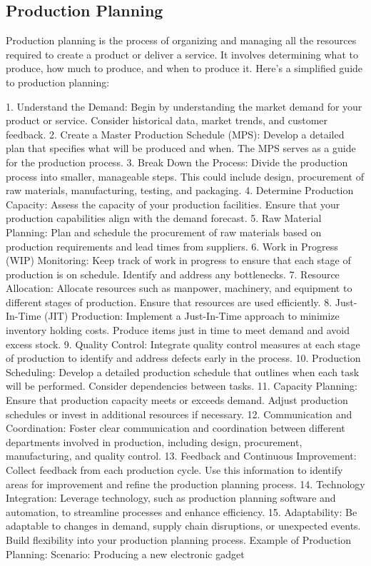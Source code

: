 % 
\subsection{Production Planning}
\label{relatedknowledge:Supply Chain Management:Production Planning}
% 
Production planning is the process of organizing and managing all the resources required to create a product or deliver a service. It involves determining what to produce, how much to produce, and when to produce it. Here's a simplified guide to production planning:

1. Understand the Demand:
Begin by understanding the market demand for your product or service. Consider historical data, market trends, and customer feedback.
2. Create a Master Production Schedule (MPS):
Develop a detailed plan that specifies what will be produced and when. The MPS serves as a guide for the production process.
3. Break Down the Process:
Divide the production process into smaller, manageable steps. This could include design, procurement of raw materials, manufacturing, testing, and packaging.
4. Determine Production Capacity:
Assess the capacity of your production facilities. Ensure that your production capabilities align with the demand forecast.
5. Raw Material Planning:
Plan and schedule the procurement of raw materials based on production requirements and lead times from suppliers.
6. Work in Progress (WIP) Monitoring:
Keep track of work in progress to ensure that each stage of production is on schedule. Identify and address any bottlenecks.
7. Resource Allocation:
Allocate resources such as manpower, machinery, and equipment to different stages of production. Ensure that resources are used efficiently.
8. Just-In-Time (JIT) Production:
Implement a Just-In-Time approach to minimize inventory holding costs. Produce items just in time to meet demand and avoid excess stock.
9. Quality Control:
Integrate quality control measures at each stage of production to identify and address defects early in the process.
10. Production Scheduling:
Develop a detailed production schedule that outlines when each task will be performed. Consider dependencies between tasks.
11. Capacity Planning:
Ensure that production capacity meets or exceeds demand. Adjust production schedules or invest in additional resources if necessary.
12. Communication and Coordination:
Foster clear communication and coordination between different departments involved in production, including design, procurement, manufacturing, and quality control.
13. Feedback and Continuous Improvement:
Collect feedback from each production cycle. Use this information to identify areas for improvement and refine the production planning process.
14. Technology Integration:
Leverage technology, such as production planning software and automation, to streamline processes and enhance efficiency.
15. Adaptability:
Be adaptable to changes in demand, supply chain disruptions, or unexpected events. Build flexibility into your production planning process.
Example of Production Planning:
Scenario: Producing a new electronic gadget


